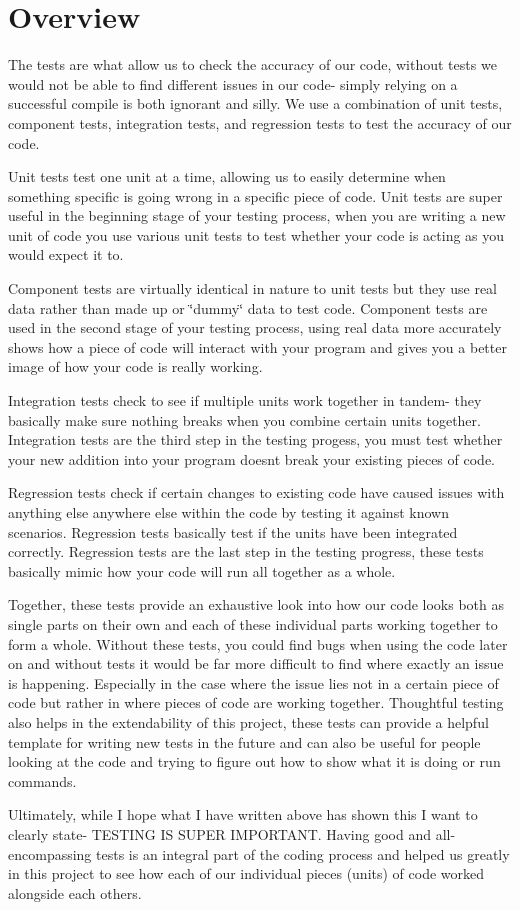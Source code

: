 \hypertarget{Tests_Testing}{}\section{Overview}\label{Tests_Testing}
The tests are what allow us to check the accuracy of our code, without tests we would not be able to find different issues in our code-\/ simply relying on a successful compile is both ignorant and silly. We use a combination of unit tests, component tests, integration tests, and regression tests to test the accuracy of our code.

Unit tests test one unit at a time, allowing us to easily determine when something specific is going wrong in a specific piece of code. Unit tests are super useful in the beginning stage of your testing process, when you are writing a new \textquotesingle{}unit\textquotesingle{} of code you use various unit tests to test whether your code is acting as you would expect it to.

Component tests are virtually identical in nature to unit tests but they use real data rather than made up or \char`\"{}dummy\char`\"{} data to test code. Component tests are used in the second stage of your testing process, using real data more accurately shows how a piece of code will interact with your program and gives you a better image of how your code is really working.

Integration tests check to see if multiple units work together in tandem-\/ they basically make sure nothing breaks when you combine certain units together. Integration tests are the third step in the testing progess, you must test whether your new addition into your program doesn\textquotesingle{}t break your existing pieces of code.

Regression tests check if certain changes to existing code have caused issues with anything else anywhere else within the code by testing it against known scenarios. Regression tests basically test if the units have been integrated correctly. Regression tests are the last step in the testing progress, these tests basically mimic how your code will run all together as a whole.

Together, these tests provide an exhaustive look into how our code looks both as single parts on their own and each of these individual parts working together to form a whole. Without these tests, you could find bugs when using the code later on and without tests it would be far more difficult to find where exactly an issue is happening. Especially in the case where the issue lies not in a certain piece of code but rather in where pieces of code are working together. Thoughtful testing also helps in the extendability of this project, these tests can provide a helpful template for writing new tests in the future and can also be useful for people looking at the code and trying to figure out how to show what it is doing or run commands.

Ultimately, while I hope what I have written above has shown this I want to clearly state-\/ T\+E\+S\+T\+I\+NG IS S\+U\+P\+ER I\+M\+P\+O\+R\+T\+A\+NT. Having good and all-\/encompassing tests is an integral part of the coding process and helped us greatly in this project to see how each of our individual pieces (units) of code worked alongside each others. 
